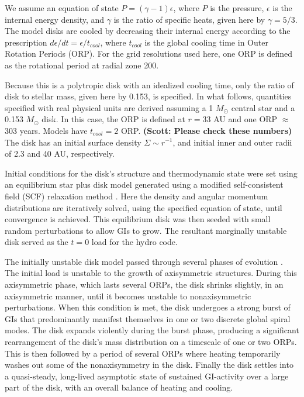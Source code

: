 \documentclass[manuscript]{aastex} %
\begin{document}
We assume an equation of state $P = (\gamma -1)\epsilon$, where $P$ is the pressure, $\epsilon$ is the internal energy density, and $\gamma$ is the ratio of specific heats, given here by $\gamma = 5/3$.  The model disks are cooled by decreasing their internal energy according to the prescription $d\epsilon/dt = \epsilon / t_{cool}$, where $t_{cool}$ is the global cooling time in Outer Rotation Periods (ORP).  For the grid resolutions used here, one ORP is defined as the rotational period at radial zone 200.


Because this is a polytropic disk with an idealized cooling time, only the ratio of disk to stellar mass, given here by 0.153, is specified.  In what follows, quantities specified with real physical units are derived assuming a 1 $M_\odot$ central star and a 0.153  $M_\odot$ disk. In this case, the ORP is defined at $r = 33$ AU and one ORP $\approx$ 303 years.  Models have $t_{cool} = 2$ ORP.   {\bf (Scott: Please check these numbers)}
The disk has an initial surface density $\Sigma \sim r^{ -1}$, and initial inner and outer radii of 2.3 and 40 AU, respectively.  

Initial conditions for the disk's structure and thermodynamic state were set using an equilibrium star plus disk model generated using a modified \citet{hachisu1986} self-consistent field (SCF) relaxation method \citep{pickett1996,pickett2003,mejiaphd2004,mejia2005,cai2006}. Here  the density and angular momentum distributions are iteratively solved, using the specified equation of state,  until convergence is achieved. This  equilibrium disk was then seeded with small random perturbations to allow GIs to grow.  The resultant marginally unstable disk served as the $t = 0$ load for the hydro code.

The initially unstable disk model passed through several phases of evolution \citep[see also]{pickett2003, mejia2005}.  The initial load is unstable to the growth of axisymmetric structures. During this axisymmetric phase, 
which lasts several ORPs, the disk shrinks slightly, in an axisymmetric manner, until it becomes unstable to nonaxisymmetric perturbations.    When this condition is met, the disk undergoes a strong burst of GIs that predominantly manifest themselves in one or two discrete global spiral modes.  The disk expands violently during the burst phase, producing a significant rearrangement of the disk's mass distribution on a timescale of one or
two ORPs. This is then followed by a period of several ORPs where heating temporarily washes out some of the nonaxisymmetry in the disk.  Finally the disk settles into a quasi-steady, long-lived asymptotic state of sustained GI-activity over a large part of the disk, with an overall balance of heating and cooling.
\end{document}
